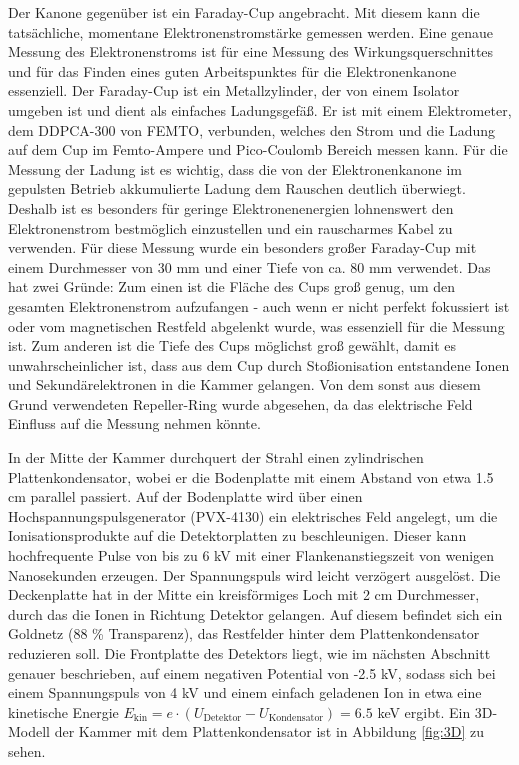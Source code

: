 Der Kanone gegenüber ist ein Faraday-Cup angebracht. Mit diesem kann die tatsächliche, momentane Elektronenstromstärke gemessen werden. Eine genaue Messung des Elektronenstroms ist für eine Messung des Wirkungsquerschnittes und für das Finden eines guten Arbeitspunktes für die Elektronenkanone essenziell. Der Faraday-Cup ist ein Metallzylinder, der von einem Isolator umgeben ist und dient als einfaches Ladungsgefäß. Er ist mit einem Elektrometer, dem DDPCA-300 von \textsc{FEMTO}, verbunden, welches den Strom und die Ladung auf dem Cup im Femto-Ampere und Pico-Coulomb Bereich messen kann. Für die Messung der Ladung ist es wichtig, dass die von der Elektronenkanone im gepulsten Betrieb akkumulierte Ladung dem Rauschen deutlich überwiegt. Deshalb ist es besonders für geringe Elektronenenergien lohnenswert den Elektronenstrom bestmöglich einzustellen und ein rauscharmes Kabel zu verwenden. Für diese Messung wurde ein besonders großer Faraday-Cup mit einem Durchmesser von 30 mm und einer Tiefe von ca. 80 mm verwendet. Das hat zwei Gründe: Zum einen ist die Fläche des Cups groß genug, um den gesamten Elektronenstrom aufzufangen - auch wenn er nicht perfekt fokussiert ist oder vom magnetischen Restfeld abgelenkt wurde, was essenziell für die Messung ist. Zum anderen ist die Tiefe des Cups möglichst groß gewählt, damit es unwahrscheinlicher ist, dass aus dem Cup durch Stoßionisation entstandene Ionen und Sekundärelektronen in die Kammer gelangen. Von dem sonst aus diesem Grund verwendeten Repeller-Ring wurde abgesehen, da das elektrische Feld Einfluss auf die Messung nehmen könnte.

In der Mitte der Kammer durchquert der Strahl einen zylindrischen Plattenkondensator, wobei er die Bodenplatte mit einem Abstand von etwa 1.5 cm parallel passiert. Auf der Bodenplatte wird über einen Hochspannungspulsgenerator (PVX-4130) ein elektrisches Feld angelegt, um die Ionisationsprodukte auf die Detektorplatten zu beschleunigen. Dieser kann hochfrequente Pulse von bis zu 6 kV mit einer Flankenanstiegszeit von wenigen Nanosekunden erzeugen. Der Spannungspuls wird leicht verzögert ausgelöst. Die Deckenplatte hat in der Mitte ein kreisförmiges Loch mit 2 cm Durchmesser, durch das die Ionen in Richtung Detektor gelangen. Auf diesem befindet sich ein Goldnetz (88 \% Transparenz), das Restfelder hinter dem Plattenkondensator reduzieren soll. Die Frontplatte des Detektors liegt, wie im nächsten Abschnitt genauer beschrieben, auf einem negativen Potential von -2.5 kV, sodass sich bei einem Spannungspuls von 4 kV und einem einfach geladenen Ion in etwa eine kinetische Energie $E_{\text{kin}} = e \cdot (U_{\text{Detektor}} - U_{\text{Kondensator}}) = 6.5$ keV ergibt. Ein 3D-Modell der Kammer mit dem Plattenkondensator ist in Abbildung \ref{fig:3D} zu sehen.

